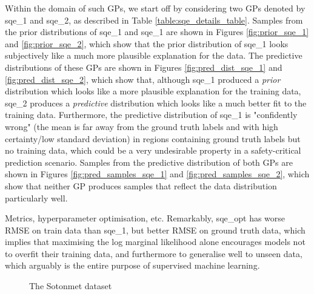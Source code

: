 \documentclass{article}
\begin{document}
Within the domain of such GPs, we start off by considering two GPs denoted by sqe\_1 and sqe\_2, as described in Table \ref{table:sqe_details_table}. Samples from the prior distributions of sqe\_1 and sqe\_1 are shown in Figures \ref{fig:prior_sqe_1} and \ref{fig:prior_sqe_2}, which show that the prior distribution of sqe\_1 looks subjectively like a much more plausible explanation for the data. The predictive distributions of these GPs are shown in Figures \ref{fig:pred_dist_sqe_1} and \ref{fig:pred_dist_sqe_2}, which show that, although sqe\_1 produced a \emph{prior} distribution which looks like a more plausible explanation for the training data, sqe\_2 produces a \emph{predictive} distribution which looks like a much better fit to the training data. Furthermore, the predictive distribution of sqe\_1 is "confidently wrong" (the mean is far away from the ground truth labels and with high certainty/low standard deviation) in regions containing ground truth labels but no training data, which could be a very undesirable property in a safety-critical prediction scenario. Samples from the predictive distribution of both GPs are shown in Figures \ref{fig:pred_samples_sqe_1} and \ref{fig:pred_samples_sqe_2}, which show that neither GP produces samples that reflect the data distribution particularly well.

Metrics, hyperparameter optimisation, etc. Remarkably, sqe\_opt has worse RMSE on train data than sqe\_1, but better RMSE on ground truth data, which implies that maximising the log marginal likelihood alone encourages models not to overfit their training data, and furthermore to generalise well to unseen data, which arguably is the entire purpose of supervised machine learning.

\appendix


\begin{figure}[pht]
    \centering
    \caption{The Sotonmet dataset}
    \label{fig:sotonmet}
\end{figure}
\end{document}
